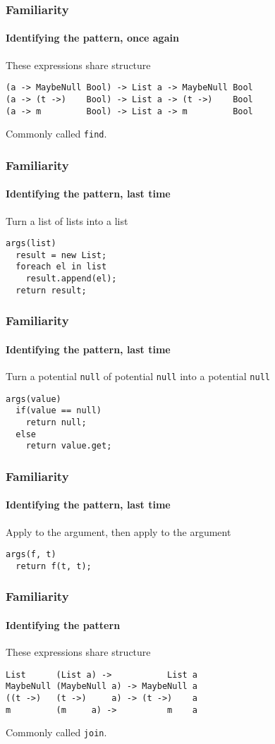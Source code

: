 \begin{frame}[fragile]
\frametitle{Familiarity}
\framesubtitle{Identifying the pattern, once again}
\begin{block}{These expressions share structure}
\begin{lstlisting}[style=language]
(a -> MaybeNull Bool) -> List a -> MaybeNull Bool
(a -> (t ->)    Bool) -> List a -> (t ->)    Bool
(a -> m         Bool) -> List a -> m         Bool
\end{lstlisting}
\end{block}
Commonly called \lstinline{find}.
\end{frame}

\begin{frame}[fragile]
\frametitle{Familiarity}
\framesubtitle{Identifying the pattern, last time}
\begin{block}{Turn a list of lists into a list}
\begin{lstlisting}[style=language]
args(list)
  result = new List;
  foreach el in list
    result.append(el);
  return result;
\end{lstlisting}
\end{block}
\end{frame}

\begin{frame}[fragile]
\frametitle{Familiarity}
\framesubtitle{Identifying the pattern, last time}
\begin{block}{Turn a potential \lstinline{null} of potential \lstinline{null} into a potential \lstinline{null}}
\begin{lstlisting}[style=language]
args(value)
  if(value == null)
    return null;
  else
    return value.get;
\end{lstlisting}
\end{block}
\end{frame}

\begin{frame}[fragile]
\frametitle{Familiarity}
\framesubtitle{Identifying the pattern, last time}
\begin{block}{Apply to the argument, then apply to the argument}
\begin{lstlisting}[style=language]
args(f, t)
  return f(t, t);
\end{lstlisting}
\end{block}
\end{frame}

\begin{frame}[fragile]
\frametitle{Familiarity}
\framesubtitle{Identifying the pattern}
\begin{block}{These expressions share structure}
\begin{lstlisting}[style=language]
List      (List a) ->           List a
MaybeNull (MaybeNull a) -> MaybeNull a
((t ->)   (t ->)     a) -> (t ->)    a
m         (m     a) ->          m    a
\end{lstlisting}
\end{block}
Commonly called \lstinline{join}.
\end{frame}

